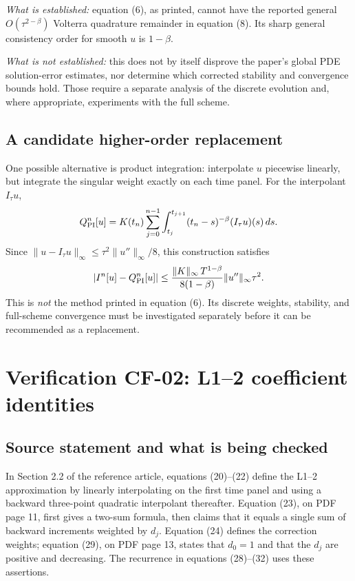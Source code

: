 \documentclass[11pt,a4paper]{amsart}
\theoremstyle{remark}
\theoremstyle{plain}
\theoremstyle{remark}
\numberwithin{equation}{section}
\begin{document}
\emph{What is established:} equation (6), as printed, cannot have the reported general $O(\tau^{2-\beta})$ Volterra quadrature remainder in equation (8). Its sharp general consistency order for smooth $u$ is $1-\beta$.

\emph{What is not established:} this does not by itself disprove the paper's global PDE solution-error estimates, nor determine which corrected stability and convergence bounds hold. Those require a separate analysis of the discrete evolution and, where appropriate, experiments with the full scheme.

\subsection{A candidate higher-order replacement}
One possible alternative is product integration: interpolate $u$ piecewise linearly, but integrate the singular weight exactly on each time panel. For the interpolant $I_\tau u$,
\[
 Q_{\rm PI}^n[u]=K(t_n)\sum_{j=0}^{n-1}
 \int_{t_j}^{t_{j+1}}(t_n-s)^{-\beta}(I_\tau u)(s)\,ds.
\]
Since $\|u-I_\tau u\|_\infty\le\tau^2\|u''\|_\infty/8$, this construction satisfies
\[
 |I^n[u]-Q_{\rm PI}^n[u]|
 \le\frac{\|K\|_\infty\,T^{1-\beta}}{8(1-\beta)}
 \|u''\|_\infty\tau^2.
\]
This is \emph{not} the method printed in equation (6). Its discrete weights, stability, and full-scheme convergence must be investigated separately before it can be recommended as a replacement.


\section{Verification CF-02: L1--2 coefficient identities}
\label{sec:verified-l12}

\subsection{Source statement and what is being checked}
In Section 2.2 of the reference article, equations (20)--(22) define the L1--2 approximation by linearly interpolating on the first time panel and using a backward three-point quadratic interpolant thereafter. Equation (23), on PDF page 11, first gives a two-sum formula, then claims that it equals a single sum of backward increments weighted by $d_j$. Equation (24) defines the correction weights; equation (29), on PDF page 13, states that $d_0=1$ and that the $d_j$ are positive and decreasing. The recurrence in equations (28)--(32) uses these assertions.
\end{document}
